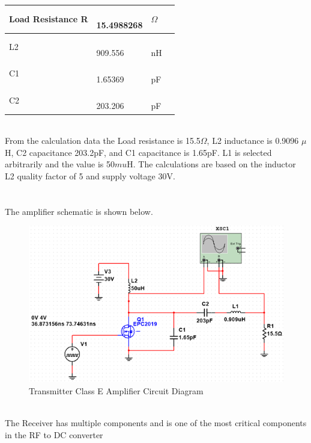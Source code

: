 \documentclass[12pt]{article}
\begin{document}
\begin{table}[h!]
\begin{tabular}{| l | l | l | l |}
\parbox{0.24\linewidth}{\raggedleft Load Resistance R} & 
\parbox{0.240\linewidth}{\hfill \\
15.4988268
\\} & \parbox{0.240\linewidth}{\hfill \\
$\Omega$
\\}\\ \hline
\parbox{0.24\linewidth}{\raggedleft L2} & 
\parbox{0.240\linewidth}{\hfill \\
909.556
\\} & \parbox{0.240\linewidth}{\hfill \\
nH
\\}\\ \hline
\parbox{0.24\linewidth}{\raggedleft C1} & 
\parbox{0.240\linewidth}{\hfill \\
1.65369
\\} & \parbox{0.240\linewidth}{\hfill \\
pF
\\}\\ \hline
\parbox{0.24\linewidth}{\raggedleft C2} & 
\parbox{0.240\linewidth}{\hfill \\
203.206
\\} & \parbox{0.240\linewidth}{\hfill \\
pF
\\}\\ \hline
\end{tabular}
\end{table}
\hfill \\

From the calculation data the Load resistance is 15.5$\Omega$, L2 inductance is 0.9096 $\mu$H, C2 capacitance 203.2pF, and C1 capacitance is 1.65pF. L1 is selected arbitrarily and the value is 50$mu$H. The calculations are based on the inductor L2 quality factor of 5 and supply voltage 30V.\\
\hfill \\
\pagebreak
\hfill \\
The amplifier schematic is shown below.
\hfill
\begin{figure}[h!]
\centering
\includegraphics[width=0.9\linewidth]{sim_recvr}
\caption{Transmitter Class E Amplifier Circuit Diagram}
\end{figure}
\hfill \\
\indent
The Receiver has multiple components and is one of the most critical components in the RF to DC converter\\
\end{document}
